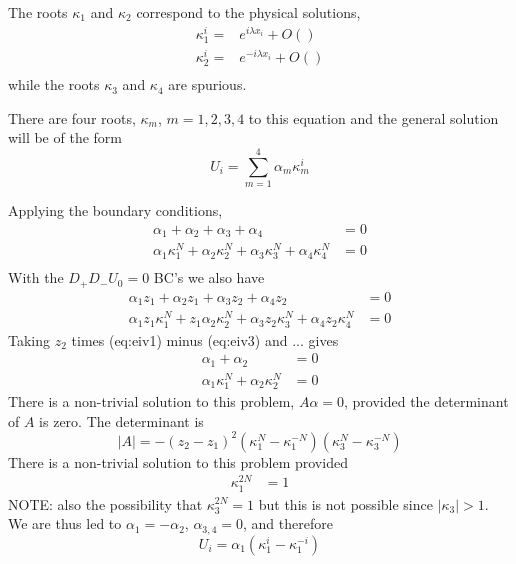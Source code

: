 The roots $\kappa_1$ and $\kappa_2$ correspond to the physical solutions,
\begin{align*}
   \kappa_1^i =& e^{ i \lambda x_i} + O()\\
   \kappa_2^i =& e^{-i \lambda x_i} + O()\\
\end{align*}
while the roots $\kappa_3$ and $\kappa_4$ are spurious.

There are four roots, $\kappa_m$, $m=1,2,3,4$ to this equation
and the general solution will be of the form
\[
   U_i = \sum_{m=1}^4 \alpha_m \kappa_m^i
\]

Applying the boundary conditions,
\begin{align}
     \alpha_1 + \alpha_2 + \alpha_3 + \alpha_4 &= 0 \label{eq:eiv1}\\
     \alpha_1\kappa_1^N + \alpha_2\kappa_2^N + \alpha_3\kappa_3^N + \alpha_4\kappa_4^N &= 0\label{eq:eiv2} \\
\end{align}
With the $D_+D_-U_0=0$ BC's we also have
\begin{align}
  \alpha_1 z_1 + \alpha_2 z_1 + \alpha_3 z_2 + \alpha_4 z_2 &= 0  \label{eq:eiv3}\\
  \alpha_1 z_1\kappa_1^N + z_1\alpha_2\kappa_2^N + \alpha_3 z_2\kappa_3^N + \alpha_4 z_2\kappa_4^N &= 0 \label{eq:eiv4}
\end{align}
Taking $z_2$ times (eq:eiv1) minus (eq:eiv3)  and ... gives
\begin{align}
  \alpha_1 + \alpha_2 &= 0 \\
  \alpha_1 \kappa_1^N + \alpha_2\kappa_2^N &=0 
\end{align}
There is a non-trivial solution to this problem, $A\alpha=0$, provided the determinant of $A$ is
zero.
The determinant is 
\[
  |A| =  - (z_2-z_1)^2 (\kappa_1^N - \kappa_1^{-N})(\kappa_3^N - \kappa_3^{-N})
\]
There is a non-trivial solution to this problem provided
\begin{align}
  \kappa_1^{2N} &=1 
\end{align}
NOTE: also the possibility that $\kappa_3^{2N}=1$ but this is not possible since $|\kappa_{3}|>1$. 
We are thus led to $\alpha_1=-\alpha_2$, $\alpha_{3,4}=0$,
and therefore
\[
   U_i = \alpha_1 (\kappa_1^i - \kappa_1^{-i} )
\]


